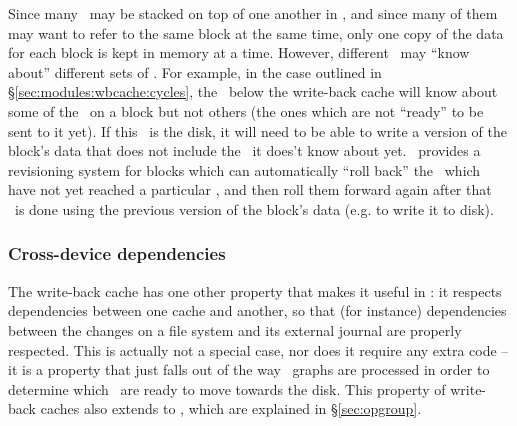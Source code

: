 Since many \modules\ may be stacked on top of one another in \Kudos,
and since many of them may want to refer to the same block at the same
time, only one copy of the data for each block is kept in memory at a
time. However, different \modules\ may ``know about'' different sets
of \chdescs. For example, in the case outlined in
\S\ref{sec:modules:wbcache:cycles}, the \module\ below the write-back
cache will know about some of the \chdescs\ on a block but not others
(the ones which are not ``ready'' to be sent to it yet). If this
\module\ is the disk, it will need to be able to write a version of
the block's data that does not include the \chdescs\ it does't know
about yet. \Kudos\ provides a revisioning system for blocks which can
automatically ``roll back'' the \chdescs\ which have not yet reached a
particular \module, and then roll them forward again after that
\module\ is done using the previous version of the block's data
(e.g. to write it to disk).

\subsubsection{Cross-device dependencies}

The write-back cache has one other property that makes it useful in \Kudos: it
respects dependencies between one cache and another, so that (for instance)
dependencies between the changes on a file system and its external journal are
properly respected. This is actually not a special case, nor does it require any
extra code -- it is a property that just falls out of the way \chdesc\ graphs
are processed in order to determine which \chdescs\ are ready to move towards
the disk. This property of write-back caches also extends to \opgroups, which
are explained in \S\ref{sec:opgroup}.
